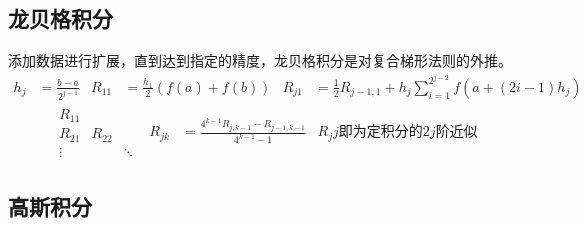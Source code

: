\documentclass[twocolumn]{article}
\begin{document}
\subsection{龙贝格积分}
添加数据进行扩展，直到达到指定的精度，龙贝格积分是对复合梯形法则的外推。
\begin{align*}
    h_j & =\frac{b-a}{2^{j-1}} & R_{11} & =\frac{h_1}{2}(f(a)+f(b)) & R_{j1} & =\frac{1}{2}R_{j-1,1}+h_j\sum_{i=1}^{2^{j-2}}f(a+(2i-1)h_j)
\end{align*}
\begin{align*}
           & \begin{matrix}
        R_{11} &        &        \\
        R_{21} & R_{22} &        \\
        \vdots &        & \ddots
    \end{matrix}                      &
    R_{jk} & =\frac{4^{k-1}R_{j,k-1}-R_{j-1,k-1}}{4^{k-1}-1} & R_jj\text{即为定积分的}2j\text{阶近似}
\end{align*}

\subsection{高斯积分}
\end{document}
